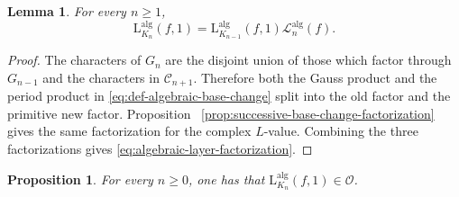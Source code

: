 \documentclass[11pt,table]{amsart}
\newtheorem{lemma}[theorem]{Lemma}
\newtheorem{proposition}[theorem]{Proposition}
\numberwithin{equation}{section}
\begin{document}
\begin{lemma}
\label{lem:algebraic-layer-factorization}
For every \(n\geq1\),
\begin{equation}
\label{eq:algebraic-layer-factorization}
        \mathrm{L}_{K_n}^{\operatorname{alg}}(f,1)
        =
        \mathrm{L}_{K_{n-1}}^{\operatorname{alg}}(f,1)
        \mathscr L_n^{\operatorname{alg}}(f).
\end{equation}
\end{lemma}

\begin{proof}
The characters of \(G_n\) are the disjoint union of those which factor
through \(G_{n-1}\) and the characters in
\(\mathcal C_{n+1}\).  Therefore both the Gauss product and the period
product in \eqref{eq:def-algebraic-base-change} split into the old
factor and the primitive new factor.  Proposition~
\ref{prop:successive-base-change-factorization} gives the same
factorization for the complex \(L\)-value.  Combining the three
factorizations gives
\eqref{eq:algebraic-layer-factorization}.
\end{proof}
\begin{proposition}
\label{prop:algebraic-L-integrality}
For every \(n\geq0\), one has that $\mathrm{L}_{K_n}^{\operatorname{alg}}(f,1)
        \in\mathcal O$.
\end{proposition}
\end{document}
